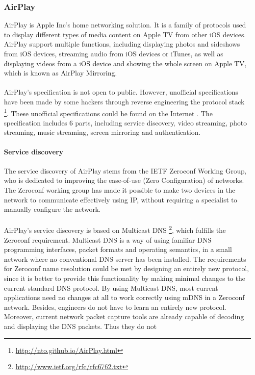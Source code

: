 \subsubsection{AirPlay\label{2_2_3}} 
AirPlay is Apple Inc's home networking solution. It is a family of protocols 
used to display different types of media content on Apple TV from other iOS devices. 
AirPlay support multiple functions, including displaying photos and sideshows from iOS devices, streaming audio from iOS devices or iTunes, as well as displaying videos from a iOS device and 
showing the whole screen on Apple TV, which is known as AirPlay Mirroring. \\
\\
AirPlay's specification is not open to public. However, unofficial
specifications have been made by some hackers through reverse engineering the
protocol stack \footnote{\url{http://nto.github.io/AirPlay.html}}. These
unofficial specifications could be found on the Internet \cite{AirPlay-spec}.
The specification includes 6 parts, including service discovery, video
streaming, photo streaming, music streaming, screen mirroring and
authentication.\\
\\
\textbf{Service discovery} \\
\\ 
The service discovery of AirPlay stems from the IETF Zeroconf Working Group, 
who is dedicated to improving the ease-of-use (Zero Configuration) of networks. The 
Zeroconf working group has made it possible to make two devices in the 
network to communicate effectively using IP, without requiring a specialist to manually 
configure the network. \\
\\
AirPlay's service discovery is based on Multicast DNS \cite{multicastdns}
\footnote{\url{http://www.ietf.org/rfc/rfc6762.txt}}, which fulfills the
Zeroconf requirement. Multicast DNS is a way of using familiar DNS programming interfaces, packet formats and operating semantics, in a small 
network where no conventional DNS server has been installed. The requirements 
for Zeroconf name resolution could be met by designing an entirely new 
protocol, since it is better to provide this functionality by making minimal changes 
to the current standard DNS protocol. By using Multicast DNS, most current 
applications need no changes at all to work correctly using mDNS in a Zeroconf network. Besides,
engineers do not have to learn an entirely new protocol. Moreover, current network 
packet capture tools are already capable of  decoding and displaying the DNS packets. Thus they do not 
